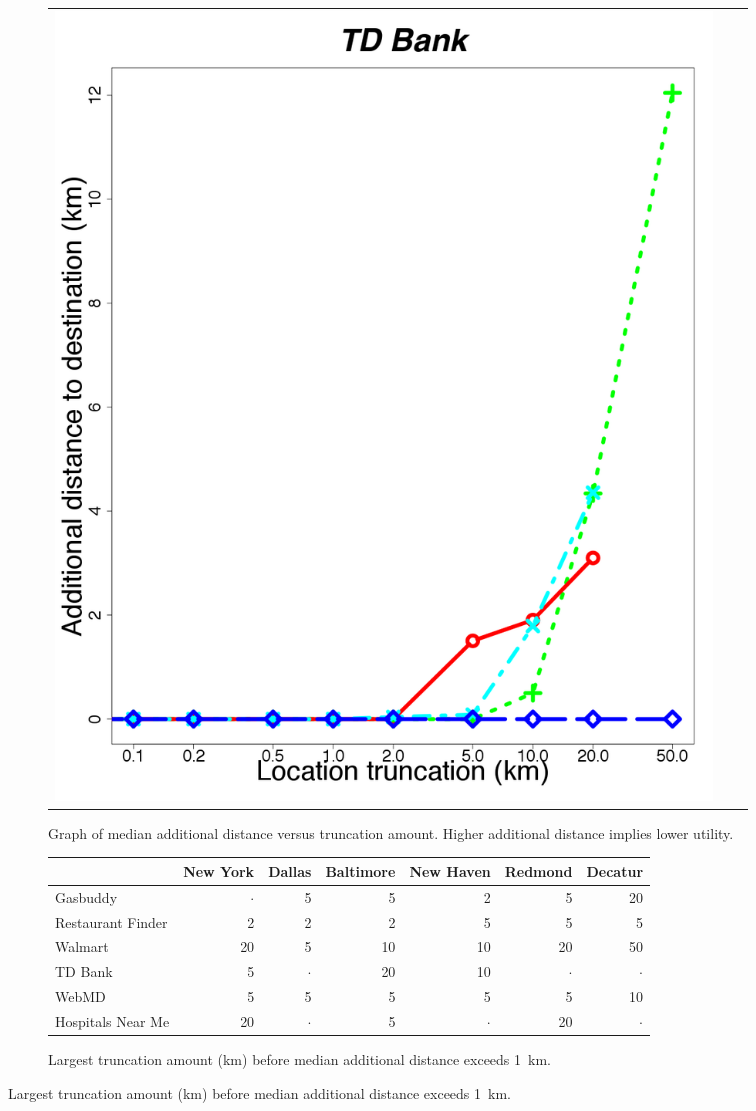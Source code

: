 \documentclass[10pt, conference, compsocconf]{IEEEtran}
\begin{document}
\begin{figure}[t!]
\begin{subfigure}{\textwidth}
\begin{tabular}{ccc}
    \begin{minipage}{2in}
      \includegraphics[width=\textwidth]
                      {data/tdbank/plots/medians_across_city_additional_distance}
    \end{minipage}
  \end{tabular}
  \caption{Graph of median additional distance versus
    truncation amount.  Higher additional distance implies lower
    utility.}
  \label{fig:add_distance}
  \end{subfigure}

  \bigskip{}

  \begin{subfigure}{\textwidth}
 \small
 \centering
 \begin{tabular}{|l|rrrrrr|}
 \hline
 & New York & Dallas & Baltimore & New Haven & Redmond & Decatur \\
 \hline
 Gasbuddy & $\cdot$ & 5 & 5 & 2 & 5 & 20 \\
Restaurant Finder & 2 & 2 & 2 & 5 & 5 & 5 \\
Walmart & 20 & 5 & 10 & 10 & 20 & 50 \\
TD Bank & 5 & $\cdot$ & 20 & 10 & $\cdot$ & $\cdot$ \\
WebMD & 5 & 5 & 5 & 5 & 5 & 10 \\
Hospitals Near Me & 20 & $\cdot$ & 5 & $\cdot$ & 20 & $\cdot$ \\
\hline
\end{tabular}
\caption{Largest truncation amount (km) before median additional
  distance exceeds 1~km.}
 \label{fig:knee-points-additional-cutoff}


\end{subfigure}
\end{figure}
\end{document}
